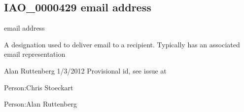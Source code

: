\documentclass[letterpaper,10pt,english]{sphinxmanual}
\begin{document}
\subsection{IAO\_0000429 \sphinxhyphen{} email address}
\label{\detokenize{doc-IAO_0000429:iao-0000429-email-address}}\label{\detokenize{doc-IAO_0000429:index-0}}\label{\detokenize{doc-IAO_0000429::doc}}
\begin{sphinxShadowBox}

\sphinxAtStartPar
email address
\end{sphinxShadowBox}

\begin{sphinxShadowBox}

\sphinxAtStartPar
{\hyperref[\detokenize{doc-IAO_0000030::doc}]{}}
\end{sphinxShadowBox}

\begin{sphinxShadowBox}

\sphinxAtStartPar
A designation used to deliver email to a recipient.  Typically has an associated email representation
\end{sphinxShadowBox}

\begin{sphinxShadowBox}

\sphinxAtStartPar
Alan Ruttenberg 1/3/2012 \sphinxhyphen{} Provisional id, see issue at 
\end{sphinxShadowBox}

\begin{sphinxShadowBox}

\sphinxAtStartPar
{}
\end{sphinxShadowBox}

\begin{sphinxShadowBox}

\sphinxAtStartPar
Person:Chris Stoeckart

\sphinxAtStartPar
Person:Alan Ruttenberg
\end{sphinxShadowBox}
\begin{quote}

\ignorespaces \end{quote}
\end{document}
